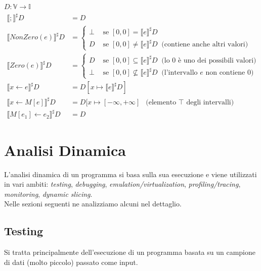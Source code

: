 \documentclass{article}
\begin{document}
                $D : \mathbb{V} \rightarrow \mathbb{I}$
                \begin{align*}
                    \llbracket ; \rrbracket^\sharp D &= D\\
                    \llbracket NonZero(e) \rrbracket^\sharp D &=
                    \begin{cases}
                        \bot &\text{ se } [0, 0] = \llbracket e \rrbracket^\sharp D \\
                        D &\text{ se } [0, 0] \neq \llbracket e \rrbracket^\sharp D~ \text{ (contiene anche altri valori)}
                    \end{cases}\\
                    \llbracket Zero(e) \rrbracket^\sharp D &=
                    \begin{cases}
                        D &\text{ se } [0, 0] \subseteq \llbracket e \rrbracket^\sharp D~ \text{ (lo $0$ è uno dei possibili valori)} \\
                        \bot &\text{ se } [0, 0] \not \subseteq \llbracket e \rrbracket^\sharp D~ \text{ (l'intervallo $e$ non contiene $0$)}
                    \end{cases}\\
                    \llbracket x\leftarrow e \rrbracket^\sharp D &= D[x\mapsto \llbracket e\rrbracket^\sharp D]\\
                    \llbracket x\leftarrow M[e] \rrbracket^\sharp D &= D[x\mapsto [-\infty, +\infty]~~ \text{ (elemento $\top$ degli intervalli)}\\
                    \llbracket M[e_1]\leftarrow e_2 \rrbracket^\sharp D &= D
                \end{align*}

    \section{Analisi Dinamica}
        L'analisi dinamica di un programma si basa sulla sua esecuzione e viene utilizzati in vari ambiti: \textit{testing}, \textit{debugging}, \textit{emulation/virtualization}, \textit{profiling/tracing}, \textit{monitoring}, \textit{dynamic slicing}.\\
        Nelle sezioni seguenti ne analizziamo alcuni nel dettaglio.

        \subsection{Testing}
            Si tratta principalmente dell'esecuzione di un programma basata su un campione di dati (molto piccolo) passato come input.
\end{document}
